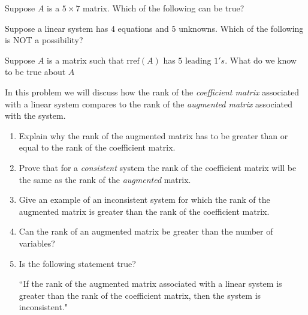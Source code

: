\documentclass{ximera}
\begin{document}
\begin{problem}\label{prob:rankofmat5}
Suppose $A$ is a $5\times 7$ matrix.  Which of the following can be true?
\begin{multipleChoice}
 \end{multipleChoice}
\end{problem}

\begin{problem}\label{prob:4eq5un}
Suppose a linear system has $4$ equations and $5$ unknowns.  Which of the following is NOT a possibility?
\begin{multipleChoice}
 \end{multipleChoice}
\end{problem}

\begin{problem}\label{prob:leadones}
Suppose $A$ is a matrix such that $\mbox{rref}(A)$ has $5$ leading $1's$.  What do we know to be true about $A$
\begin{selectAll}
 \end{selectAll}
\end{problem}

\begin{problem}\label{prob:rankaugvscoeff}
In this problem we will discuss how the rank of the {\it coefficient matrix} associated with a linear system compares to the rank of the {\it augmented matrix} associated with the system.  
\begin{enumerate}
\item Explain why the rank of the augmented matrix has to be greater than or equal to the rank of the coefficient matrix.
    \item Prove that for a {\it consistent} system the rank of the coefficient matrix will be the same as the rank of the {\it augmented} matrix.
    \item Give an example of an inconsistent system for which the rank of the augmented matrix is greater than the rank of the coefficient matrix.
    \item Can the rank of an augmented matrix be greater than the number of variables?
    \item Is the following statement true?
    
    ``If the rank of the augmented matrix associated with a linear system is greater than the rank of the coefficient matrix, then the system is inconsistent."
\end{enumerate}
\end{problem}
\end{document}

